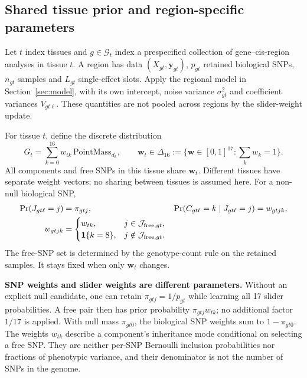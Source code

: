 \documentclass[11pt]{article}
\newcommand{\ind}{\mathbf 1}
\begin{document}
\subsection{Shared tissue prior and region-specific parameters}
Let $t$ index tissues and $g\in\mathcal G_t$ index a prespecified collection
of gene--cis-region analyses in tissue $t$. A region has data
$(X_{gt},\mathbf y_{gt})$, $p_{gt}$ retained biological SNPs, $n_{gt}$ samples
and $L_{gt}$ single-effect slots. Apply the regional model in
Section~\ref{sec:model}, with its own intercept, noise variance
$\sigma^2_{gt}$ and coefficient variances $V_{gt\ell}$. These quantities
are not pooled across regions by the slider-weight update.

For tissue $t$, define the discrete distribution
\begin{equation}
 G_t=\sum_{k=0}^{16}w_{tk}\,\mathrm{PointMass}_{d_k},\qquad
 \mathbf w_t\in\Delta_{16}
 :=\{\mathbf w\in[0,1]^{17}:\textstyle\sum_kw_k=1\}.
 \label{eq:tissue-prior}
\end{equation}
All components and free SNPs in this tissue share $\mathbf w_t$.
Different tissues have separate weight vectors; no sharing between tissues
is assumed here. For a non-null biological SNP,
\begin{align}
 \Pr(J_{gt\ell}=j)&=\pi_{gtj},&
 \Pr(C_{gt\ell}=k\mid J_{gt\ell}=j)&=w_{gtjk},\nonumber\\
 w_{gtjk}&=
 \begin{cases}
   w_{tk},&j\in\mathcal J_{{\rm free},gt},\\
   \ind\{k=8\},&j\notin\mathcal J_{{\rm free},gt}.
 \end{cases}
 \label{eq:tissue-effective-prior}
\end{align}
The free-SNP set is determined by the genotype-count rule on the retained
samples. It stays fixed when only $\mathbf w_t$ changes.

\textbf{SNP weights and slider weights are different parameters.}
Without an explicit null candidate, one can retain
$\pi_{gtj}=1/p_{gt}$ while learning all 17 slider probabilities.
A free pair then has prior probability $\pi_{gtj}w_{tk}$; no additional
factor $1/17$ is applied. With null mass $\pi_{gt0}$, the biological SNP
weights sum to $1-\pi_{gt0}$. The weights $w_{tk}$ describe a component's
inheritance mode conditional on selecting a free SNP. They are neither
per-SNP Bernoulli inclusion probabilities nor fractions of phenotypic
variance, and their denominator is not the number of SNPs in the genome.
\end{document}
